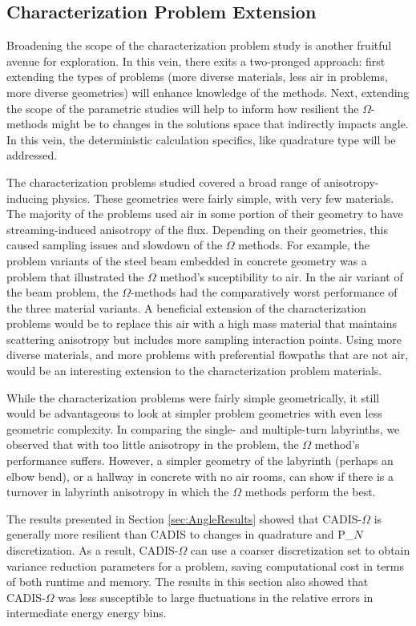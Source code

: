 \subsection{Characterization Problem Extension}
\label{subsec:extendcharprobs}

Broadening the scope
of the characterization problem study
is another fruitful avenue for exploration. In this
vein, there exits a two-pronged approach: first extending the types of problems
(more diverse materials, less air in problems, more diverse geometries) will
enhance knowledge of the methods. Next, extending the scope of the parametric
studies will help to inform how resilient the $\Omega$-methods might be to
changes in the solutions space that indirectly impacts angle.
In this vein, the deterministic calculation specifics, like
quadrature type will be addressed.

The characterization problems studied covered a broad range of
anisotropy-inducing physics. These geometries were fairly simple, with very few
materials. The majority of the problems used air in some portion of their
geometry to have streaming-induced anisotropy of the flux. Depending on their
geometries, this caused sampling issues and slowdown of the $\Omega$ methods.
For example, the problem variants of the
steel beam embedded in concrete geometry was a
problem that illustrated the $\Omega$ method's suceptibility to air. In the air
variant of the beam problem, the $\Omega$-methods had the comparatively worst
performance of the three material variants. A
beneficial extension of the characterization problems would be to replace this
air with a high mass material that maintains scattering anisotropy but includes more
sampling interaction points. Using more diverse materials, and more problems
with preferential flowpaths that are not air, would be an interesting extension
to the characterization problem materials.

While the characterization problems were fairly simple geometrically, it still
would be advantageous to look at simpler problem geometries with even less
geometric complexity. In
comparing the single- and multiple-turn labyrinths, we observed that with too
little anisotropy in the problem, the $\Omega$ method's performance suffers.
However, a simpler
geometry of the labyrinth (perhaps an elbow bend), or a hallway in concrete with
no air rooms, can show if there is a turnover in labyrinth anisotropy in which
the $\Omega$ methods perform the best.

The results presented in Section \ref{sec:AngleResults} showed that
CADIS-$\Omega$ is generally more resilient than CADIS to changes in
quadrature and P_$N$ discretization.
As a result, CADIS-$\Omega$ can use a coarser
discretization set to obtain variance reduction parameters for a problem, saving
computational cost in terms of both runtime and memory.
The results in this section also showed that CADIS-$\Omega$ was less
susceptible to large fluctuations in the relative errors in intermediate energy
energy bins.

